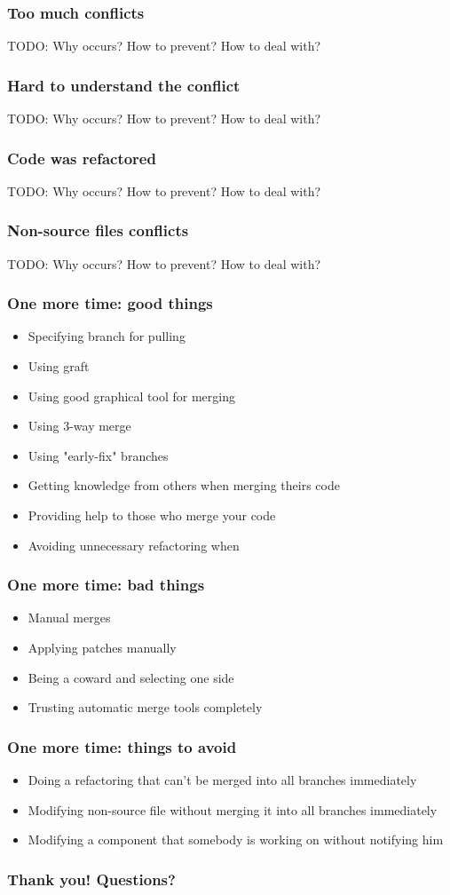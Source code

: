 \documentclass{beamer}
\begin{document}
\begin{frame}
\frametitle{Too much conflicts}
TODO: Why occurs? How to prevent? How to deal with? 
\end{frame}

\begin{frame}
\frametitle{Hard to understand the conflict}
TODO: Why occurs? How to prevent? How to deal with? 
\end{frame}

\begin{frame}
\frametitle{Code was refactored}
TODO: Why occurs? How to prevent? How to deal with? 
\end{frame}

\begin{frame}
\frametitle{Non-source files conflicts}
TODO: Why occurs? How to prevent? How to deal with? 
\end{frame}


\begin{frame}
\frametitle{One more time: good things}
\begin{itemize}
\item Specifying branch for pulling
\item Using graft
\item Using good graphical tool for merging
\item Using 3-way merge
\item Using "early-fix" branches
\item Getting knowledge from others when merging theirs code
\item Providing help to those who merge your code
\item Avoiding unnecessary refactoring when
\end{itemize}
\end{frame}

\begin{frame}
\frametitle{One more time: bad things}
\begin{itemize}
\item Manual merges
\item Applying patches manually
\item Being a coward and selecting one side
\item Trusting automatic merge tools completely
\end{itemize}
\end{frame}

\begin{frame}
\frametitle{One more time: things to avoid}
\begin{itemize}
\item Doing a refactoring that can't be merged into all branches immediately
\item Modifying non-source file without merging it into all branches immediately
\item Modifying a component that somebody is working on without notifying him 
\end{itemize}
\end{frame}


\begin{frame}
\frametitle{Thank you! Questions?}
\begin{center}
\end{center}
\end{frame}
\end{document}
